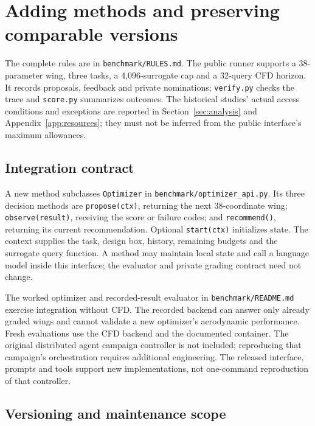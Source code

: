\section{Adding methods and preserving comparable versions}
\label{app:rules}

The complete rules are in \texttt{benchmark/RULES.md}. The public runner
supports a 38-parameter wing, three tasks, a 4{,}096-surrogate cap and a
32-query CFD horizon. It records proposals, feedback and private nominations;
\texttt{verify.py} checks the trace and \texttt{score.py} summarizes outcomes.
The historical studies' actual access conditions and exceptions are reported
in Section~\ref{sec:analysis} and Appendix~\ref{app:resources}; they must not be
inferred from the public interface's maximum allowances.

\subsection{Integration contract}

A new method subclasses \texttt{Optimizer} in
\texttt{benchmark/optimizer\_api.py}. Its three decision methods are
\texttt{propose(ctx)}, returning the next 38-coordinate wing;
\texttt{observe(result)}, receiving the score or failure codes; and
\texttt{recommend()}, returning its current recommendation. Optional
\texttt{start(ctx)} initializes state. The context supplies the task, design
box, history, remaining budgets and the surrogate query function. A method
may maintain local state and call a language model inside this interface;
the evaluator and private grading contract need not change.

The worked optimizer and recorded-result evaluator in
\texttt{benchmark/README.md} exercise integration without CFD. The recorded
backend can answer only already graded wings and cannot validate a new
optimizer's aerodynamic performance. Fresh evaluations use the CFD backend
and the documented container. The original distributed agent campaign
controller is not included; reproducing that campaign's orchestration
requires additional engineering. The released interface, prompts and tools
support new implementations, not one-command reproduction of that controller.

\subsection{Versioning and maintenance scope}

